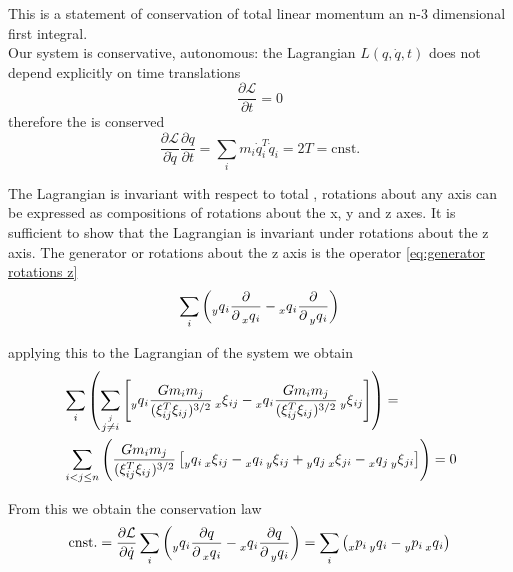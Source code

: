 \documentclass[12pt]{article}
\begin{document}
This is a statement of conservation of total linear momentum an n-3 dimensional first integral. \\

Our system is conservative, autonomous: the Lagrangian $L(q,\dot q,t)$ does not depend explicitly on time translations
$$\frac{\partial\mathcal L}{\partial t} = 0$$
therefore the  is conserved
\begin{equation}\label{eq:conservation of energy noether}
\frac{\partial\mathcal L}{\partial \dot q}\frac{\partial q}{\partial t} = \sum_i m_i\dot q_i^T \dot q_i = 2T = \text{cnst.}\end{equation}

The Lagrangian is invariant with respect to total , rotations about any axis can be expressed as compositions of rotations about the x, y and z axes. It is sufficient to show that the Lagrangian is invariant under rotations about the z axis. The generator or rotations about the z axis is the operator \eqref{eq:generator rotations z}
\begin{equation}\label{eq:generator rotations z}
    \sum_i \left(\prescript{}{y}{q}_i \frac{\partial}{\partial \prescript{}{x}{q}_i} - \prescript{}{x}{q}_i \frac{\partial}{\partial \prescript{}{y}{q}_i} \right)
\end{equation}

applying this to the Lagrangian of the system we obtain
\begin{equation}\label{eq:rotate lagrangian}
\begin{split}
&   \sum_i\left(
    \sum_{\stackrel{j}{j\neq i}}\left[
    \prescript{}{y}{q}_i \frac{Gm_im_j}{(\xi_{ij}^T\xi_{ij})^{3/2}}\prescript{}{x}{\xi}_{ij} - \prescript{}{x}{q}_i \frac{Gm_im_j}{(\xi_{ij}^T\xi_{ij})^{3/2}} \prescript{}{y}{\xi}_{ij}
    \right]\right)
    =\\
&   \sum_{i<j\leq n}\left(
    \frac{Gm_im_j}{(\xi_{ij}^T\xi_{ij})^{3/2}} \left[
    \prescript{}{y}{q}_i \prescript{}{x}{\xi}_{ij} - \prescript{}{x}{q}_i \prescript{}{y}{\xi}_{ij} + \prescript{}{y}{q}_j \prescript{}{x}{\xi}_{ji} - \prescript{}{x}{q}_j \prescript{}{y}{\xi}_{ji}
    \right]\right) = 0
\end{split}
\end{equation}

From this we obtain the conservation law 
\begin{equation}\label{eq:conservation of z angular momentum}
    \text{cnst.} = \frac{\partial\mathcal L}{\partial \dot q}\sum_i \left( \prescript{}{y}{q}_i \frac{\partial q}{\partial \prescript{}{x}{q}_i} - \prescript{}{x}{q}_i \frac{\partial q}{\partial \prescript{}{y}{q}_i} \right)
    =
    \sum_i \left( \prescript{}{x}{p}_i\prescript{}{y}{q}_i - \prescript{}{y}{p}_i \prescript{}{x}{q}_i \right)
\end{equation}
\end{document}
